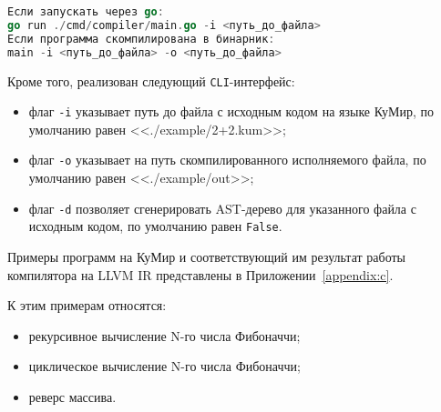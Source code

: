 \begin{lstlisting}[language=go, caption={Пример запуска реализованного компилятора}, label=lst:start]
Если запускать через go:
go run ./cmd/compiler/main.go -i <путь_до_файла> 
Если программа скомпилирована в бинарник:
main -i <путь_до_файла> -o <путь_до_файла> 
\end{lstlisting}

Кроме того, реализован следующий \texttt{CLI}-интерфейс:
\begin{itemize}
    \item флаг \texttt{-i} указывает путь до файла с исходным кодом на языке КуМир, по умолчанию равен <<./example/2+2.kum>>;
    \item флаг \texttt{-o} указывает на путь скомпилированного исполняемого файла, по умолчанию равен <<./example/out>>;
    \item флаг \texttt{-d} позволяет сгенерировать AST-дерево для указанного файла с исходным кодом, по умолчанию равен \texttt{False}.
\end{itemize}

Примеры программ на КуМир и соответствующий им результат работы компилятора на LLVM IR представлены в Приложении~\ref{appendix:c}.

К этим примерам относятся:
\begin{itemize}
    \item рекурсивное вычисление N-го числа Фибоначчи;
    \item циклическое вычисление N-го числа Фибоначчи;
    \item реверс массива.
\end{itemize}

\newpage
	